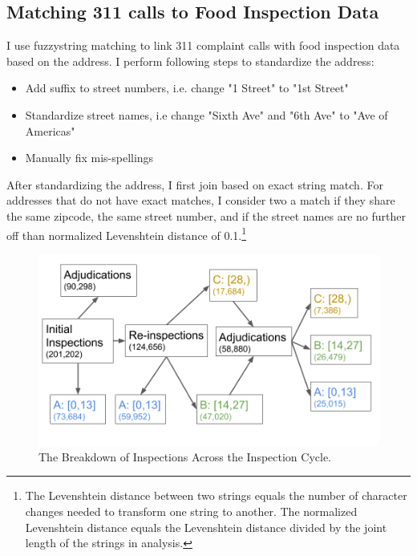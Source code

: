 \documentclass[12pt]{article}
\begin{document}
\subsection{Matching 311 calls to Food Inspection Data}
I use fuzzystring matching to link 311 complaint calls with food inspection data based on the address. I perform following steps to standardize the address:
\begin{itemize}
\item Add suffix to street numbers, i.e. change "1 Street" to "1st Street"
\item Standardize street names, i.e change "Sixth Ave" and "6th Ave" to "Ave of Americas"
\item Manually fix mis-spellings
\end{itemize}

After standardizing the address, I first join based on exact string match. For addresses that do not have exact matches, I consider two a match if they share the same zipcode, the same street number, and if the street names are no further off than normalized Levenshtein distance of 0.1.\footnote{The Levenshtein distance between two strings equals the number of character changes needed to transform one string to another. The normalized Levenshtein distance equals the Levenshtein distance divided by the joint length of the strings in analysis.}

\newpage

\begin{figure}[!htbp]
\centering
\includegraphics[scale = 0.5]{Figures/Scores.png}
\caption{The Breakdown of Inspections Across the Inspection Cycle.}
\label{pipeline}
\end{figure}
\end{document}
